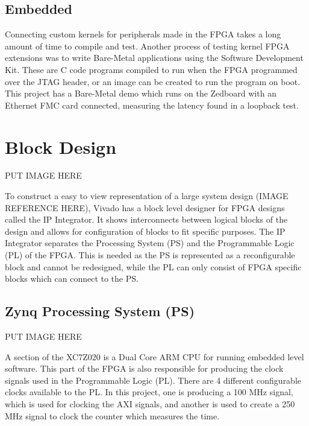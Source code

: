 \subsection{Embedded}

\par Connecting custom kernels for peripherals made in the FPGA takes a long amount of time to compile and test. 
Another process of testing kernel FPGA extensions was to write Bare-Metal applications using the Software 
Development Kit. These are C code programs compiled to run when the FPGA programmed over the JTAG header, or an 
image can be created to run the program on boot. This project has a Bare-Metal demo which runs on the Zedboard 
with an Ethernet FMC card connected, measuring the latency found in a loopback test. 

\section{Block Design}

\par PUT IMAGE HERE

\par To construct a easy to view representation of a large system design (IMAGE REFERENCE HERE), Vivado has a block level designer for
FPGA designs called the IP Integrator. It shows interconnects between logical blocks of the design and allows for 
configuration of blocks to fit specific purposes. The IP Integrator separates the Processing System (PS) and the 
Programmable Logic (PL) of the FPGA. This is needed as the PS is represented as a reconfigurable block and cannot be redesigned, while
the PL can only consist of FPGA specific blocks which can connect to the PS. 

\subsection{Zynq Processing System (PS)}

PUT IMAGE HERE

\par A section of the XC7Z020 is a Dual Core ARM CPU for running embedded level software. This part of the FPGA is also 
responsible for producing the clock signals used in the Programmable Logic (PL). There are 4 different configurable clocks
available to the PL. In this project, one is producing a 100 MHz signal, which is used for clocking the AXI signals, and another
is used to create a 250 MHz signal to clock the counter which measures the time. 

